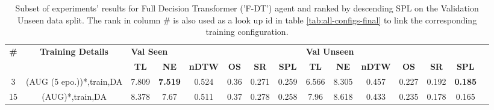 \begin{table}
\centering
\caption{\label{tab:f_dt_dagger_envdrop}Subset of experiments' results for Full Decision Transformer ('F-DT') agent and ranked by descending SPL on the Validation Unseen data split. The rank in column \# is also used as a look up id in table \ref{tab:all-configs-final} to link the corresponding training configuration.}
\begin{tabular}{@{\hskip3pt}c@{\hskip3pt}c@{\hskip3pt}c@{\hskip3pt}c@{\hskip3pt}c@{\hskip3pt}c@{\hskip3pt}c@{\hskip3pt}c@{\hskip3pt}c@{\hskip3pt}c@{\hskip3pt}c@{\hskip3pt}c@{\hskip3pt}c@{\hskip3pt}c@{\hskip3pt}c}
\toprule
\textbf{\#} & \textbf{Training Details} & \multicolumn{6}{l}{\textbf{Val Seen}} & \multicolumn{6}{l}{\textbf{Val Unseen}} \\
 \textbf{~} &                \textbf{~} &       \textbf{TL} &     \textbf{NE} & \textbf{nDTW} & \textbf{OS} & \textbf{SR} & \textbf{SPL} &         \textbf{TL} & \textbf{NE} & \textbf{nDTW} & \textbf{OS} & \textbf{SR} &    \textbf{SPL} \\
\midrule
          3 &  (AUG (5 epo.))*,train,DA &             7.809 &  \textbf{7.519} &         0.524 &        0.36 &       0.271 &        0.259 &               6.566 &       8.305 &         0.457 &       0.227 &       0.192 &  \textbf{0.185} \\
         15 &           (AUG)*,train,DA &             8.378 &            7.67 &         0.511 &        0.37 &       0.278 &        0.258 &                7.96 &       8.618 &         0.433 &       0.235 &       0.178 &           0.165 \\
\bottomrule
\end{tabular}
\end{table}
